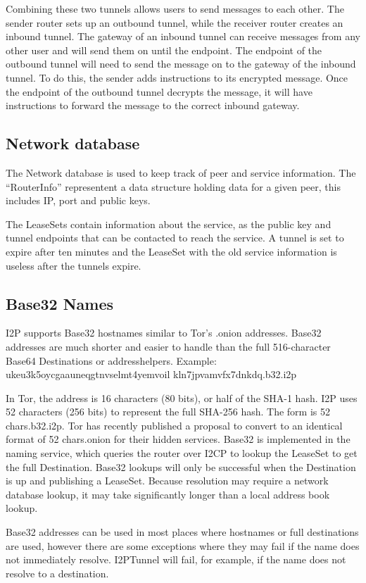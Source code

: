 \documentclass[a4paper,twocolumn,12pt]{article}
\begin{document}
Combining these two tunnels allows users to send messages to each other. The sender router sets up an outbound tunnel, while the receiver router creates an inbound tunnel. The gateway of an inbound tunnel can receive messages from any other user and will send them on until the endpoint. The endpoint of the outbound tunnel will need to send the message on to the gateway of the inbound tunnel. To do this, the sender adds instructions to its encrypted message. Once the endpoint of the outbound tunnel decrypts the message, it will have instructions to forward the message to the correct inbound gateway.

\subsection{Network database}

The Network database is used to keep track of peer and service information. The ``RouterInfo'' representent a data structure holding data for a given peer, this includes IP, port and public keys.

The LeaseSets contain information about the service, as the public key and tunnel endpoints that can be contacted to reach the service. A tunnel is set to expire after ten minutes and the LeaseSet with the old service information is useless after the tunnels expire. 

\subsection{Base32 Names}

I2P supports Base32 hostnames similar to Tor's .onion addresses. Base32 addresses are much shorter and easier to handle than the full 516-character Base64 Destinations or addresshelpers. Example: 
ukeu3k5oycgaauneqgtnvselmt4yemvoil
kln7jpvamvfx7dnkdq.b32.i2p

In Tor, the address is 16 characters (80 bits), or half of the SHA-1 hash.
\cite{tor-hiddenservice}
I2P uses 52 characters (256 bits) to represent the full SHA-256 hash. The form is {52 chars}.b32.i2p. Tor has recently published a proposal to convert to an identical format of {52 chars}.onion for their hidden services. Base32 is implemented in the naming service, which queries the router over I2CP to lookup the LeaseSet to get the full Destination. Base32 lookups will only be successful when the Destination is up and publishing a LeaseSet. Because resolution may require a network database lookup, it may take significantly longer than a local address book lookup.

Base32 addresses can be used in most places where hostnames or full destinations are used, however there are some exceptions where they may fail if the name does not immediately resolve. I2PTunnel will fail, for example, if the name does not resolve to a destination.




\end{document}
